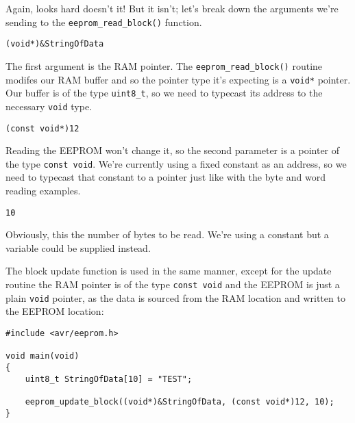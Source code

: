 \documentclass[a4paper,oneside,notitlepage]{book}
\begin{document}
Again, looks hard doesn't it! But it isn't; let's break down the arguments we're sending to the \lstinline{eeprom_read_block()} function.

\begin{center}
\begin{lstlisting}
(void*)&StringOfData
\end{lstlisting}
\end{center}

The first argument is the RAM pointer. The \lstinline{eeprom_read_block()} routine modifes our RAM buffer and so the pointer type it's expecting is a \lstinline{void*} pointer. Our buffer is of the type \lstinline{uint8_t}, so we need to typecast its address to the necessary \lstinline{void} type.

\begin{center}
\begin{lstlisting}
(const void*)12
\end{lstlisting}
\end{center}

Reading the EEPROM won't change it, so the second parameter is a pointer of the type \lstinline{const void}. We're currently using a fixed constant as an address, so we need to typecast that constant to a pointer just like with the byte and word reading examples.

\begin{center}
\begin{lstlisting}
10
\end{lstlisting}
\end{center}

Obviously, this the number of bytes to be read. We're using a constant but a variable could be supplied instead.

The block update function is used in the same manner, except for the update routine the RAM pointer is of the type \lstinline{const void} and the EEPROM is just a plain \lstinline{void} pointer, as the data is sourced from the RAM location and written to the EEPROM location:

\begin{center}
\begin{lstlisting}
#include <avr/eeprom.h>

void main(void)
{
    uint8_t StringOfData[10] = "TEST";

    eeprom_update_block((void*)&StringOfData, (const void*)12, 10);
}
\end{lstlisting}
\end{center}
\end{document}
